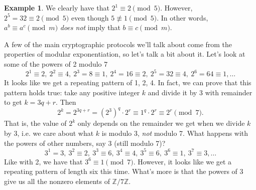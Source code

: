 \documentclass[12pt]{article}
\theoremstyle{plain}
\theoremstyle{definition}
\newtheorem{example}[theorem]{Example}
\theoremstyle{remark}
\newcommand{\Z}{\mathbb{Z}}
\begin{document}
\begin{example}
    We clearly have that $2^1 \equiv 2\pmod 5$.
    However, $2^5 = 32\equiv 2\pmod 5$ even though $5 \not\equiv 1\pmod 5$.
    In other words, $a^b \equiv a^c \pmod m$ \emph{does not} imply that $b \equiv c\pmod m$.
\end{example}

A few of the main cryptographic protocols we'll talk about come from the properties of modular exponentiation, so let's talk a bit about it.
Let's look at some of the powers of 2 modulo 7
\[
    2^1 \equiv 2,\ 2^2 \equiv 4,\ 2^3 = 8 \equiv 1,\ 2^4 = 16 \equiv 2,\ 2^5 = 32 \equiv 4,\ 2^6 = 64 \equiv 1, \ldots
\]
It looks like we get a repeating pattern of 1, 2, 4.
In fact, we can prove that this pattern holds true: take any positive integer $k$ and divide it by 3 with remainder to get $k = 3q + r$. Then
\[
    2^k = 2^{3q + r} = (2^3)^q\cdot 2^r \equiv 1^q\cdot 2^r \equiv 2^r\pmod 7.
\]
That is, the value of $2^k$ only depends on the remainder we get when we divide $k$ by 3, i.e. we care about what $k$ is modulo 3, \emph{not} modulo 7.
What happens with the powers of other numbers, say 3 (still modulo 7)?
\[
    3^1 = 3,\ 3^2 \equiv 2,\ 3^3\equiv 6,\ 3^4 \equiv 4,\ 3^5\equiv 6,\ 3^6\equiv 1,\ 3^7\equiv 3,\ldots
\]
Like with 2, we have that $3^6 \equiv 1\pmod 7$.
However, it looks like we get a repeating pattern of length six this time.
What's more is that the powers of 3 give us all the nonzero elements of $\Z/7\Z$.
\end{document}
